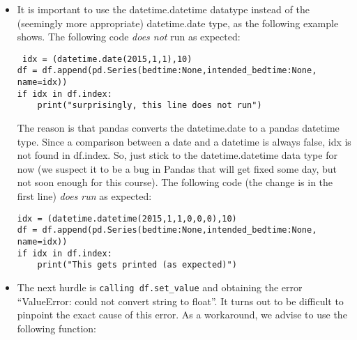 \documentclass[a4paper]{report}
\theoremstyle{definition}
\newcommand{\doublequote}{\texttt{"}}
\newcommand{\singlequote}{\char13}
\begin{document}
\begin{itemize}
\setlength\itemsep{1mm}

\item It is important to use the datetime.datetime datatype instead of
the (seemingly more appropriate) datetime.date type, as the following
example shows. The following code \emph{does not} run as expected:

\texttt{\small
idx = (datetime.date(2015,1,1),10)\\
df = df.append(pd.Series({\singlequote{}bedtime\singlequote{}:None,\singlequote{}intended\_bedtime\singlequote{}:None}, name=idx))\\
if idx in df.index:\\
\mbox{}~~~~print(\doublequote{}surprisingly, this line does not
run\doublequote{})
}

The reason is that pandas converts the
datetime.date to a pandas datetime type. Since a comparison between a date
and a datetime is always false, idx is not found in df.index. So, just stick
to the datetime.datetime data type for now (we suspect it to be a bug in
Pandas that will get fixed some day, but not soon enough for this course).
The following code (the change is in the first line) \emph{does run} as
expected:

\texttt{\small idx = (datetime.datetime(2015,1,1,0,0,0),10)\\
df = df.append(pd.Series({\singlequote{}bedtime\singlequote{}:None,\singlequote{}intended\_bedtime\singlequote{}:None}, name=idx))\\
if idx in df.index:\\
\mbox{}~~~~print(\doublequote{}This gets printed (as expected)\doublequote{})
}


\item The next hurdle is \texttt{\small calling df.set\_value} and obtaining
the error ``ValueError: could not convert string to float''. It turns
out to be difficult to pinpoint the exact cause of this error. As a
workaround, we advise to use the following function:


\end{itemize}
\end{document}
